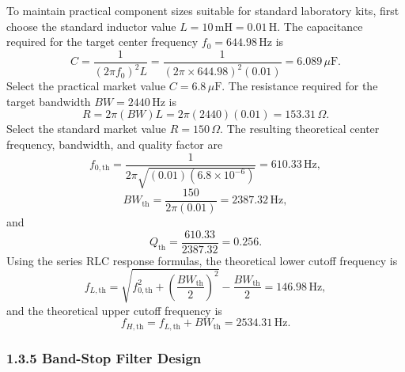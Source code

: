 \documentclass[12pt,a4paper]{article}
\begin{document}
To maintain practical component sizes suitable for standard laboratory kits, first choose the standard inductor value $L=10\,\mathrm{mH}=0.01\,\mathrm{H}$. The capacitance required for the target center frequency $f_0=644.98\,\mathrm{Hz}$ is
\begin{equation}
  C=\frac{1}{(2\pi f_0)^2L}
  =\frac{1}{(2\pi\times644.98)^2(0.01)}
  =6.089\,\mu\mathrm{F}.
  \label{eq:bp-c-calc}
\end{equation}
Select the practical market value $C=6.8\,\mu\mathrm{F}$. The resistance required for the target bandwidth $BW=2440\,\mathrm{Hz}$ is
\begin{equation}
  R=2\pi(BW)L
  =2\pi(2440)(0.01)
  =153.31\,\Omega.
  \label{eq:bp-r-calc}
\end{equation}
Select the standard market value $R=150\,\Omega$. The resulting theoretical center frequency, bandwidth, and quality factor are
\begin{equation}
  f_{0,\mathrm{th}}
  =\frac{1}{2\pi\sqrt{(0.01)(6.8\times10^{-6})}}
  =610.33\,\mathrm{Hz},
  \label{eq:bp-selected-f0}
\end{equation}
\begin{equation}
  BW_{\mathrm{th}}
  =\frac{150}{2\pi(0.01)}
  =2387.32\,\mathrm{Hz},
  \label{eq:bp-selected-bw}
\end{equation}
and
\begin{equation}
  Q_{\mathrm{th}}=\frac{610.33}{2387.32}=0.256.
  \label{eq:bp-selected-q}
\end{equation}
Using the series RLC response formulas, the theoretical lower cutoff frequency is
\begin{equation}
  f_{L,\mathrm{th}}
  =\sqrt{f_{0,\mathrm{th}}^2+\left(\frac{BW_{\mathrm{th}}}{2}\right)^2}
  -\frac{BW_{\mathrm{th}}}{2}
  =146.98\,\mathrm{Hz},
  \label{eq:bp-selected-fl}
\end{equation}
and the theoretical upper cutoff frequency is
\begin{equation}
  f_{H,\mathrm{th}}=f_{L,\mathrm{th}}+BW_{\mathrm{th}}
  =2534.31\,\mathrm{Hz}.
  \label{eq:bp-selected-fh}
\end{equation}

\subsubsection*{1.3.5 Band-Stop Filter Design}
\end{document}
